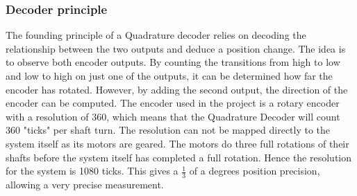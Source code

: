 \documentclass[../../../main]{subfiles}
\begin{document}
\subsubsection{Decoder principle}
The founding principle of a Quadrature decoder relies on decoding the relationship between the two outputs and deduce a position change. The idea is to observe both encoder outputs. By counting the transitions from high to low and low to high on just one of the outputs, it can be determined how far the encoder has rotated. However, by adding the second output, the direction of the encoder can be computed. The encoder used in the project is a rotary encoder with a resolution of 360\cite{encoder_datasheet}, which means that the Quadrature Decoder will count 360 "ticks" per shaft turn. The resolution  can not be mapped directly to the system itself as its motors are geared. The motors do three full rotations of their shafts before the system itself has completed a full rotation. Hence the resolution for the system is 1080 ticks. This gives a $\frac{1}{3}$ of a degrees position precision, allowing a very precise measurement.
\end{document}
